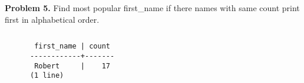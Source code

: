\documentclass[a4paper,12pt]{article}
\newenvironment{problem}[1]{\par\bigskip\noindent\textbf{Problem #1.}
  \enskip\ignorespaces}{}
\begin{document}
  \begin{problem}{5} Find most popular first\_name if there names with same count
    print first in alphabetical order.
    \inputminted[fontsize=\small, fontfamily=rm]{sql}{5.sql}
    \begin{verbatim}
       first_name | count
      ------------+-------
       Robert     |    17
      (1 line)
    \end{verbatim}
  \end{problem}
\end{document}
